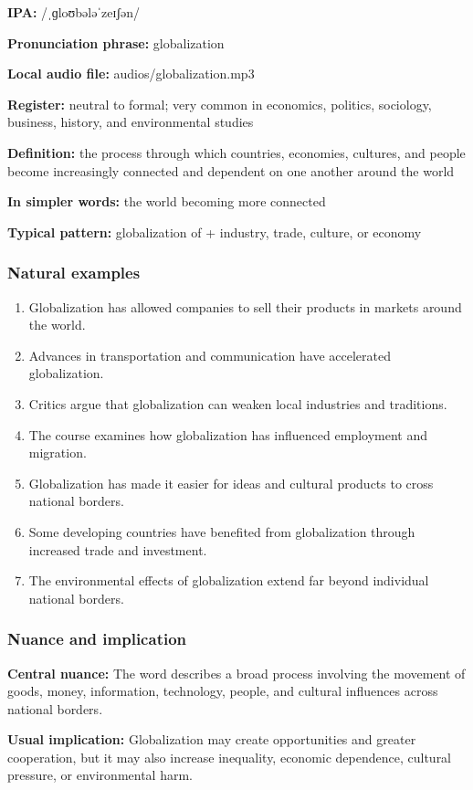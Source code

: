 \documentclass[11pt]{article}
\begin{document}
\textbf{IPA:} /ˌɡloʊbələˈzeɪʃən/

\textbf{Pronunciation phrase:} globalization

\textbf{Local audio file:} audios/globalization.mp3

\textbf{Register:} neutral to formal; very common in economics, politics, sociology, business, history, and environmental studies

\textbf{Definition:} the process through which countries, economies, cultures, and people become increasingly connected and dependent on one another around the world

\textbf{In simpler words:} the world becoming more connected

\textbf{Typical pattern:} globalization of + industry, trade, culture, or economy

\subsubsection{Natural examples}
\begin{enumerate}
  \item Globalization has allowed companies to sell their products in markets around the world.
  \item Advances in transportation and communication have accelerated globalization.
  \item Critics argue that globalization can weaken local industries and traditions.
  \item The course examines how globalization has influenced employment and migration.
  \item Globalization has made it easier for ideas and cultural products to cross national borders.
  \item Some developing countries have benefited from globalization through increased trade and investment.
  \item The environmental effects of globalization extend far beyond individual national borders.
\end{enumerate}

\subsubsection{Nuance and implication}
\textbf{Central nuance:} The word describes a broad process involving the movement of goods, money, information, technology, people, and cultural influences across national borders.

\textbf{Usual implication:} Globalization may create opportunities and greater cooperation, but it may also increase inequality, economic dependence, cultural pressure, or environmental harm.
\end{document}
